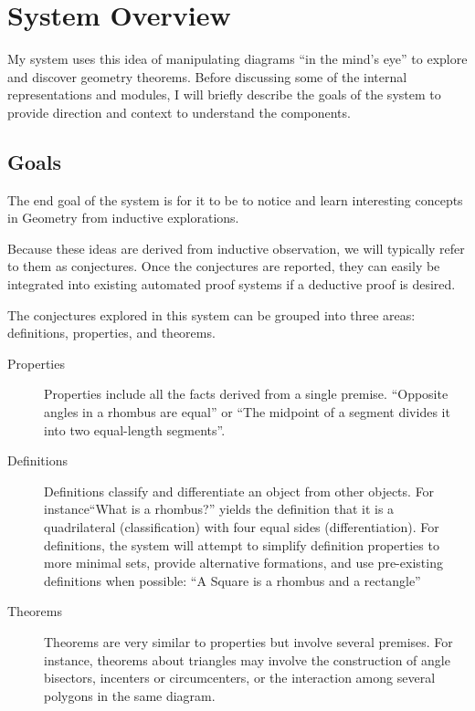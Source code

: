\chapter{System Overview}
\label{chap:sys-overview}

My system uses this idea of manipulating diagrams ``in the mind's
eye'' to explore and discover geometry theorems. Before discussing
some of the internal representations and modules, I will briefly
describe the goals of the system to provide direction and context to
understand the components.

\section{Goals}

The end goal of the system is for it to be to notice and learn
interesting concepts in Geometry from inductive explorations.

Because these ideas are derived from inductive observation, we will
typically refer to them as conjectures. Once the conjectures are
reported, they can easily be integrated into existing automated proof
systems if a deductive proof is desired.

The conjectures explored in this system can be grouped into three
areas: definitions, properties, and theorems.

\begin{description}

\item[Properties] Properties include all the facts derived from a
  single premise. ``Opposite angles in a rhombus are equal'' or ``The
  midpoint of a segment divides it into two equal-length segments''.

\item[Definitions] Definitions classify and differentiate an object
  from other objects. For instance``What is a rhombus?'' yields the
  definition that it is a quadrilateral (classification) with four
  equal sides (differentiation). For definitions, the system will
  attempt to simplify definition properties to more minimal sets,
  provide alternative formations, and use pre-existing definitions
  when possible: ``A Square is a rhombus and a rectangle''

\item[Theorems] Theorems are very similar to properties but involve
  several premises. For instance, theorems about triangles may involve
  the construction of angle bisectors, incenters or circumcenters, or
  the interaction among several polygons in the same diagram.

\end{description}

